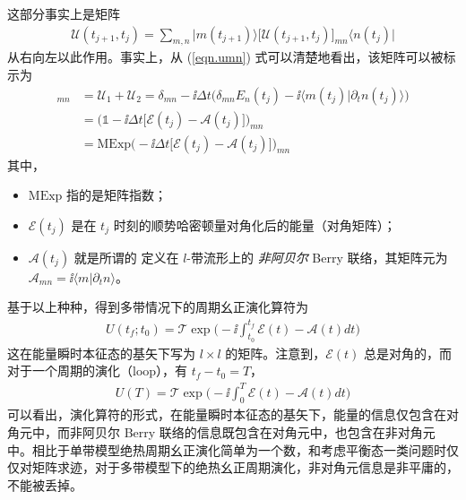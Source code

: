 这部分事实上是矩阵
\begin{align}
\mathscr{U}(t_{j+1},t_j)=\sum_{m,n}\bigg|m(t_{j+1})\bigg\rangle \big[\mathscr{U}(t_{j+1},t_j)\big]_{mn} \bigg\langle n(t_j)\bigg|
\end{align}
从右向左以此作用。事实上，从 (\ref{eqn.umn}) 式可以清楚地看出，该矩阵可以被标示为
\begin{align}
[\mathscr{U}(t_{j+1},t_j)]_{mn}&=\mathscr{U}_1+\mathscr{U}_2=\delta_{mn}-\ii\Delta t\bigg(\delta_{mn}E_{n}(t_j)-\ii\langle m(t_j)|\partial_tn(t_j)\rangle\bigg)\\
&=\bigg(\mathbb{1}-\ii\Delta t\Big[\mathcal{E}(t_j)-\mathcal{A}(t_j)\Big]\bigg)_{mn}\\
&= \text{MExp}\bigg(-\ii\Delta t\Big[\mathcal{E}(t_j)-\mathcal{A}(t_j)\Big]\bigg)_{mn}
\end{align}
其中，
\begin{itemize}
\item $\text{MExp}$ 指的是矩阵指数；
\item $\mathcal{E}(t_j)$ 是在 $t_j$ 时刻的顺势哈密顿量对角化后的能量（对角矩阵）；
\item $\mathcal{A}(t_j)$ 就是所谓的 定义在 $l$-带流形上的 \textit{非阿贝尔} Berry 联络，其矩阵元为 $\mathcal{A}_{mn}=\ii\langle m|\partial_tn\rangle$。
\end{itemize}

基于以上种种，得到多带情况下的周期幺正演化算符为
\begin{align}
U(t_f;t_0)=\mathcal{T}\exp\bigg(-\ii\int_{t_0}^{t_f}\mathcal{E}(t)-\mathcal{A}(t)dt\bigg)
\end{align}
这在能量瞬时本征态的基矢下写为 $l\times l$ 的矩阵。注意到，$\mathcal{E}(t)$ 总是对角的，而对于一个周期的演化（loop），有 $t_f-t_0=T$，
\begin{align}
U(T)=\mathcal{T}\exp\bigg(-\ii\int_{0}^{T}\mathcal{E}(t)-\mathcal{A}(t)dt\bigg)
\end{align}
可以看出，演化算符的形式，在能量瞬时本征态的基矢下，能量的信息仅包含在对角元中，而非阿贝尔 Berry 联络的信息既包含在对角元中，也包含在非对角元中。相比于单带模型绝热周期幺正演化简单为一个数，和考虑平衡态一类问题时仅仅对矩阵求迹，对于多带模型下的绝热幺正周期演化，非对角元信息是非平庸的，不能被丢掉。







